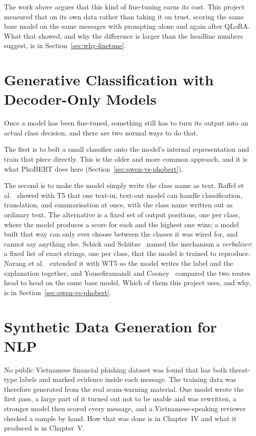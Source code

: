 The work above argues that this kind of fine-tuning earns its cost. This project measured that on its own data rather than taking it on trust, scoring the same base model on the same messages with prompting alone and again after QLoRA. What that showed, and why the difference is larger than the headline numbers suggest, is in Section~\ref{sec:why-finetune}.

\section{Generative Classification with Decoder-Only Models}

Once a model has been fine-tuned, something still has to turn its output into an actual class decision, and there are two normal ways to do that.

The first is to bolt a small classifier onto the model's internal representation and train that piece directly. This is the older and more common approach, and it is what PhoBERT does here (Section~\ref{sec:qwen-vs-phobert}).

The second is to make the model simply write the class name as text. Raffel et al.~\cite{raffel2020t5} showed with T5 that one text-in, text-out model can handle classification, translation, and summarisation at once, with the class name written out as ordinary text. The alternative is a fixed set of output positions, one per class, where the model produces a score for each and the highest one wins; a model built that way can only ever choose between the classes it was wired for, and cannot say anything else. Schick and Sch{\"u}tze~\cite{schick2021pet} named the mechanism a \textit{verbalizer}: a fixed list of exact strings, one per class, that the model is trained to reproduce. Narang et al.~\cite{narang2020wt5} extended it with WT5 so the model writes the label and the explanation together, and Yousefiramandi and Cooney~\cite{yousefiramandi2025finetuning} compared the two routes head to head on the same base model. Which of them this project uses, and why, is in Section~\ref{sec:qwen-vs-phobert}.

\section{Synthetic Data Generation for NLP}

No public Vietnamese financial phishing dataset was found that has both threat-type labels and marked evidence inside each message. The training data was therefore generated from the real scam-warning material. One model wrote the first pass, a large part of it turned out not to be usable and was rewritten, a stronger model then scored every message, and a Vietnamese-speaking reviewer checked a sample by hand. How that was done is in Chapter~IV and what it produced is in Chapter~V.

